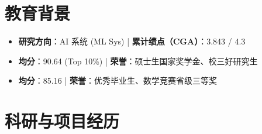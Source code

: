 \documentclass{resume}
\begin{document}





\section{教育背景}

\vspace{0.08cm}
\begin{itemize} [parsep=0.3ex]
  \item \textbf{研究方向}：AI 系统 (ML Sys) \quad | \quad \textbf{累计绩点（CGA）}：3.843 / 4.3
\end{itemize}

\begin{itemize} [parsep=0.3ex]
  \item \textbf{均分}：90.64 (Top 10\%) \quad | \quad \textbf{荣誉}：硕士生国家奖学金、校三好研究生
\end{itemize}

\begin{itemize} [parsep=0.3ex]
  \item \textbf{均分}：85.16 \quad | \quad \textbf{荣誉}：优秀毕业生、数学竞赛省级三等奖
\end{itemize}

\section{科研与项目经历}
\vspace{0.08cm}
\end{document}

